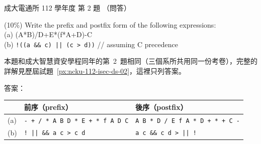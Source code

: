 \begin{pastexam}[label={px:ncku-112-cce-ds-02}]{成大電通所 112 學年度 第 2 題}
（問答）

(10\%) Write the prefix and postfix form of the following expressions:\\
(a) (A*B)/D+E*(f*A+D)-C\\
(b) \texttt{!((a \&\& c) || (c > d))} \qquad\qquad // assuming C precedence
\end{pastexam}

\begin{pastsoln}
本題和成大智慧資安學程同年的第~2~題相同（三個系所共用同一份考卷），完整的詳解見歷屆試題~\ref{px:ncku-112-isec-ds-02}，這裡只列答案。

答案：
\begin{center}
\begin{tabular}{lll}
\toprule
 & 前序（prefix） & 後序（postfix） \\
\midrule
(a) & \texttt{- + / * A B D * E + * f A D C} & \texttt{A B * D / E f A * D + * + C -} \\
(b) & \texttt{! || \&\& a c > c d} & \texttt{a c \&\& c d > || !} \\
\bottomrule
\end{tabular}
\end{center}
\end{pastsoln}
